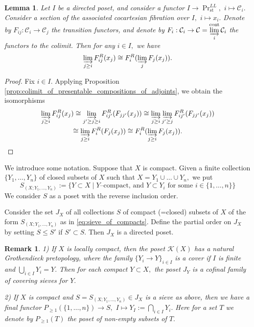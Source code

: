 \documentclass[11pt,leqno]{amsart}
\newtheorem{lemma}[theo]{Lemma}
\newtheorem{remark}[theo]{Remark}
\numberwithin{equation}{section}
\newcommand{\ms}[1]{\mathscr{#1}}
\newcommand{\msK}{\ms{K}}
\newcommand{\indlim}[1][]{\mathop{\varinjlim}\limits_{#1}}
\newcommand{\cont}{\operatorname{cont}}
\newcommand{\st}{\operatorname{st}}
\newcommand{\cC}{{\mathcal C}}
\begin{document}
\begin{lemma}\label{lem:auxiliary_on_colimits} Let $I$ be a directed poset, and consider a functor $I\to\Pr^{LL}_{\st},$ $i\mapsto\cC_i.$  Consider a section of the associated cocartesian fibration over $I,$ $i\mapsto x_i.$ Denote by $F_{ij}:\cC_i\to\cC_j$ the transition functors, and denote by $F_i:\cC_i\to\cC=\indlim[i]^{\cont}\cC_i$ the functors to the colimit. Then for any $i\in I,$ we have
$$\indlim[j\geq i]F_{ij}^R (x_j)\cong F_i^R(\indlim[j]F_j(x_j)).$$
\end{lemma}

\begin{proof}Fix $i\in I.$ Applying Proposition \ref{prop:colimit_of_presentable_compositions_of_adjoints}, we obtain the isomorphisms
\begin{multline*}\indlim[j\geq i]F_{ij}^R (x_j)\cong \indlim[j'\geq j\geq i]F_{ij'}^R (F_{jj'}(x_j))\cong \indlim[j\geq i]\indlim[j'\geq j]F_{ij'}^R (F_{jj'}(x_j))\\ \cong \indlim[j\geq i]F_i^R(F_j(x_j))\cong F_i^R(\indlim[j\geq i]F_j(x_j)).\qedhere \end{multline*}
\end{proof}

We introduce some notation. Suppose that $X$ is compact. Given a finite collection $\{Y_1,\dots,Y_n\}$ of closed subsets of $X$ such that $X=Y_1\cup\dots\cup Y_n,$ we put \begin{equation}\label{eq:sieve_of_compacts}S_{(X;Y_1,\dots,Y_n)}:=\{Y\subset X\mid Y\text{--compact, and }Y\subset Y_i\text{ for some }i\in\{1,\dots,n\}\}\end{equation} We consider $S$ as a poset with the reverse inclusion order. 

Consider the set $J_X$ of all collections $S$ of compact (=closed) subsets of $X$ of the form $S_{(X;Y_1,\dots,Y_n)}$ as in \eqref{eq:sieve_of_compacts}. Define the partial order on $J_X$ by setting $S\leq S'$ if $S'\subset S.$ Then $J_X$ is a directed poset.

\begin{remark}\label{remark:finitary_topology} 1) If $X$ is locally compact, then the poset $\msK(X)$ has a natural Grothendieck pretopology, where the family $\{Y_i\to Y\}_{i\in I}$ is a cover if $I$ is finite and $\bigcup_{i\in I} Y_i=Y.$ Then for each compact $Y\subset X,$ the poset $J_Y$ is a cofinal family of covering sieves for $Y.$

2) If $X$ is compact and $S=S_{(X;Y_1,\dots,Y_n)}\in J_X$ is a sieve as above, then we have a final functor $P_{\geq 1}(\{1,\dots,n\})\to S,$ $I\mapsto Y_I:=\bigcap_{i\in I} Y_i.$ Here for a set $T$ we denote by $P_{\geq 1}(T)$ the poset of non-empty subsets of $T.$\end{remark}
\end{document}
